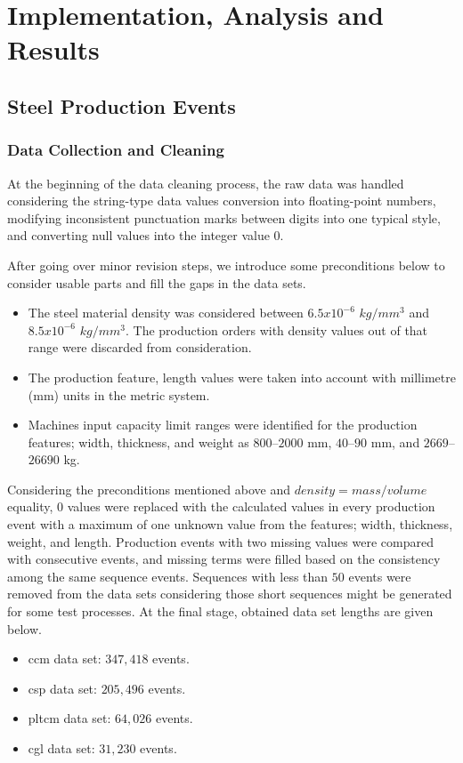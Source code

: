 \chapter{Implementation, Analysis and Results}\label{implementation_analysis}
\section{Steel Production Events}
\subsection{Data Collection and Cleaning}\label{data_collection_cleaning}

At the beginning of the data cleaning process, the raw data was handled considering the string-type data values conversion into floating-point numbers, modifying inconsistent punctuation marks between digits into one typical style, and converting null values into the integer value $0$. 

After going over minor revision steps, we introduce some preconditions below to consider usable parts and fill the gaps in the data sets.
\begin{itemize}
	\item The steel material density was considered between $6.5 x 10^{-6}$ $kg/mm^{3}$ and $8.5 x 10^{-6}$ $kg/mm^{3}$. The production orders with density values out of that range were discarded from consideration.
	\item The production feature, length values were taken into account with millimetre (mm) units in the metric system.
	\item {\color{red}Machines input capacity limit ranges were identified for the production features; width, thickness, and weight as $800$--$2000$ mm, $40$--$90$ mm, and $2669$--$26690$ kg.}
\end{itemize}

Considering the preconditions mentioned above and $density = mass/volume$ equality, $0$ values were replaced with the calculated values in every production event with a maximum of one unknown value from the features; width, thickness, weight, and length. Production events with two missing values were compared with consecutive events, and missing terms were filled based on the consistency among the same sequence events. Sequences with less than $50$ events were removed from the data sets considering those short sequences might be generated for some test processes. At the final stage, obtained data set lengths are given below.
\begin{itemize}
	\item \acs{ccm} data set: $347,418$ events.
	\item \acs{csp} data set: $205,496$ events.
	\item \acs{pltcm} data set: $64,026$ events.
	\item \acs{cgl} data set: $31,230$ events.
\end{itemize}

